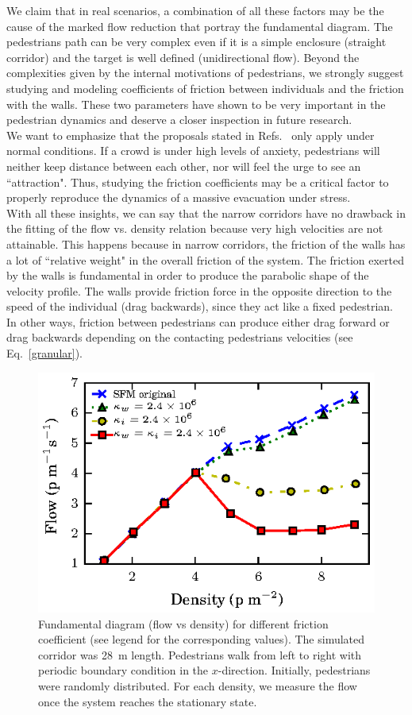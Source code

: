 \documentclass[preprint,12pt]{elsarticle}
\begin{document}
We claim that in real scenarios, a combination of all these factors may be the cause of the marked flow reduction that portray the fundamental diagram. The pedestrians path can be very complex even if it is a simple enclosure (straight corridor) and the target is well defined (unidirectional flow). Beyond the complexities given by the internal motivations of pedestrians, we strongly suggest studying and modeling coefficients of friction between individuals and the friction with the walls. These two parameters have shown to be very important in the pedestrian dynamics and deserve a closer inspection in future research.\\

We want to emphasize that the proposals stated in Refs.~\cite{parisi2,johansson,kwak}  only apply under normal conditions. If a crowd is under high levels of anxiety, pedestrians will neither keep distance between each other, nor will feel the urge to see an ``attraction". Thus, studying the friction coefficients may be a critical factor to properly reproduce the dynamics of a massive evacuation under stress.\\

With all these insights, we can say that the narrow corridors have no drawback in the fitting of the flow vs. density relation because very high velocities are not attainable. This happens because in narrow corridors, the friction of the walls has a lot of ``relative weight" in the overall friction of the system. 
The friction exerted by the walls is fundamental in order to produce the parabolic shape of the velocity profile. The walls provide friction force in the opposite direction to the speed of the individual (drag backwards), since they act like a fixed pedestrian. In other ways, friction between pedestrians can produce either drag forward or drag backwards depending on the contacting pedestrians velocities (see Eq.~\ref{granular}).\\


\begin{figure}[htbp!]
\centering
\includegraphics[width=0.7\columnwidth]
{./flow-density_pasillo22m_fgmodified_multi.eps}
\caption{\label{fgmodified-w22} Fundamental diagram (flow vs density) for different friction coefficient (see legend for the corresponding values). The simulated corridor was 28~m length. Pedestrians walk from left to right with periodic boundary condition in the $x$-direction. Initially, pedestrians were randomly distributed. For each density, we measure the flow once the system reaches the stationary state.}
\end{figure}
\end{document}
